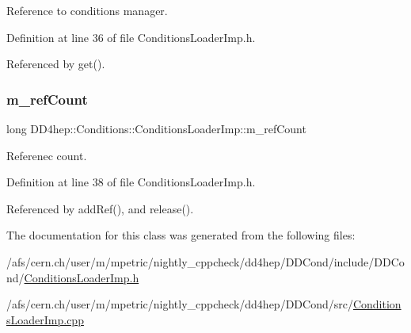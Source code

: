Reference to conditions manager. 



Definition at line 36 of file Conditions\+Loader\+Imp.\+h.



Referenced by get().

\hypertarget{class_d_d4hep_1_1_conditions_1_1_conditions_loader_imp_aa108f7ae2788453c48cd29ad11596c76}{}\label{class_d_d4hep_1_1_conditions_1_1_conditions_loader_imp_aa108f7ae2788453c48cd29ad11596c76} 
\subsubsection{\texorpdfstring{m\+\_\+ref\+Count}{m\_refCount}}
{\footnotesize\ttfamily long D\+D4hep\+::\+Conditions\+::\+Conditions\+Loader\+Imp\+::m\+\_\+ref\+Count\hspace{0.3cm}{\ttfamily [protected]}}



Referenec count. 



Definition at line 38 of file Conditions\+Loader\+Imp.\+h.



Referenced by add\+Ref(), and release().



The documentation for this class was generated from the following files\+:\begin{DoxyCompactItemize}
\item 
/afs/cern.\+ch/user/m/mpetric/nightly\+\_\+cppcheck/dd4hep/\+D\+D\+Cond/include/\+D\+D\+Cond/\hyperlink{_conditions_loader_imp_8h}{Conditions\+Loader\+Imp.\+h}\item 
/afs/cern.\+ch/user/m/mpetric/nightly\+\_\+cppcheck/dd4hep/\+D\+D\+Cond/src/\hyperlink{_conditions_loader_imp_8cpp}{Conditions\+Loader\+Imp.\+cpp}\end{DoxyCompactItemize}

